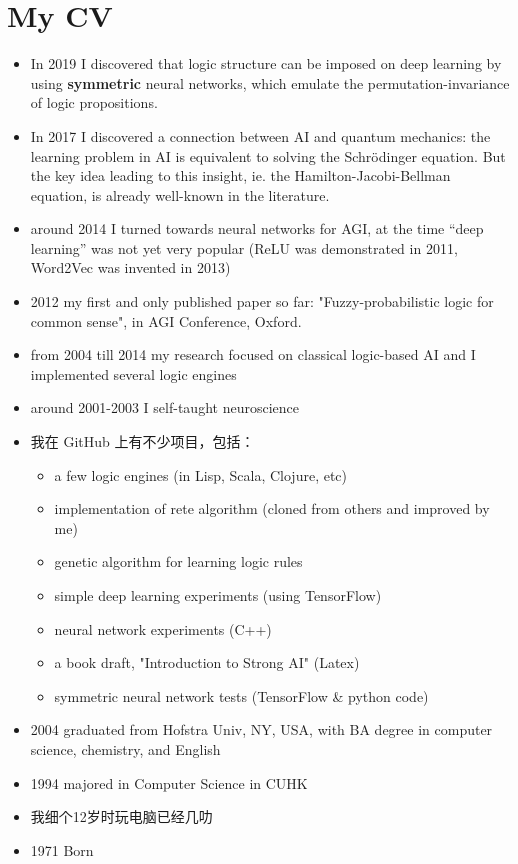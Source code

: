 \section{My CV}

\begin{itemize}
	\item In 2019 I discovered that logic structure can be imposed on deep learning by using \textbf{symmetric} neural networks, which emulate the permutation-invariance of logic propositions.
	\item In 2017 I discovered a connection between AI and quantum mechanics: the learning problem in AI is equivalent to solving the Schr\"{o}dinger equation.  But the key idea leading to this insight, ie. the Hamilton-Jacobi-Bellman equation, is already well-known in the literature.

	\item around 2014 I turned towards neural networks for AGI, at the time ``deep learning'' was not yet very popular (ReLU was demonstrated in 2011, Word2Vec was invented in 2013)
	\item 2012 my first and only published paper so far: "Fuzzy-probabilistic logic for common sense", in AGI Conference, Oxford.
	\item from 2004 till 2014 my research focused on classical logic-based AI and I implemented several logic engines
	\item around 2001-2003 I self-taught neuroscience

	\item 我在 GitHub 上有不少项目，包括：
	\begin{itemize}
		\item a few logic engines (in Lisp, Scala, Clojure, etc)
		\item implementation of rete algorithm (cloned from others and improved by me)
		\item genetic algorithm for learning logic rules
		\item simple deep learning experiments (using TensorFlow)
		\item neural network experiments (C++)
		\item a book draft, "Introduction to Strong AI" (Latex)
		\item symmetric neural network tests (TensorFlow \& python code)
	\end{itemize}

	\item 2004 graduated from Hofstra Univ, NY, USA, with BA degree in computer science, chemistry, and English
	\item 1994 majored in Computer Science in CUHK
	\item 我细个12岁时玩电脑已经几叻
	\item 1971 Born
\end{itemize}

